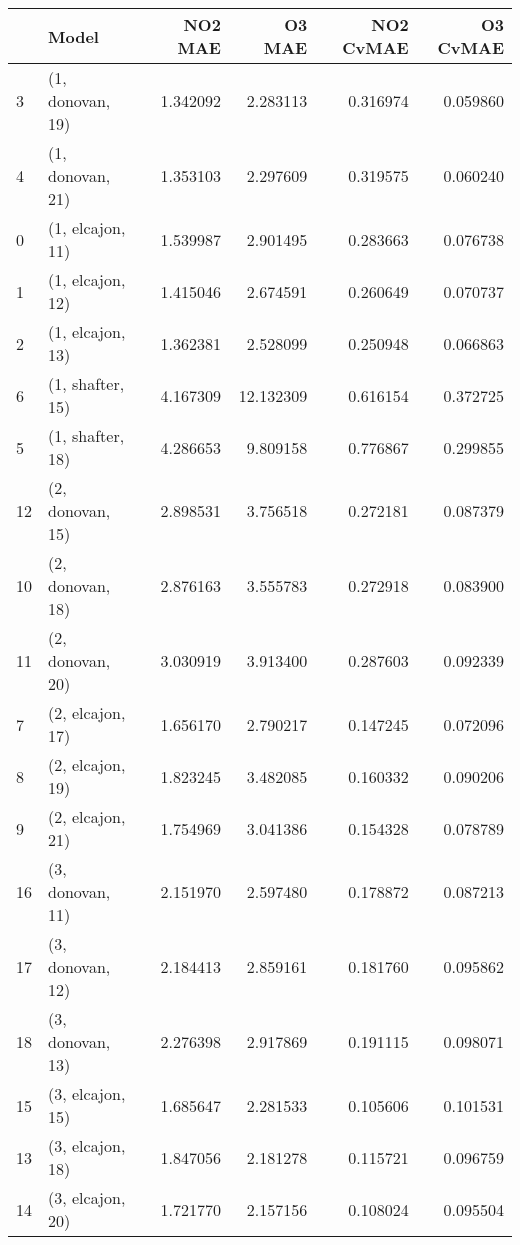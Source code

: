 \begin{tabular}{llrrrr}
\toprule
{} &             Model &   NO2 MAE &     O3 MAE &  NO2 CvMAE &  O3 CvMAE \\
\midrule
3  &  (1, donovan, 19) &  1.342092 &   2.283113 &   0.316974 &  0.059860 \\
4  &  (1, donovan, 21) &  1.353103 &   2.297609 &   0.319575 &  0.060240 \\
0  &  (1, elcajon, 11) &  1.539987 &   2.901495 &   0.283663 &  0.076738 \\
1  &  (1, elcajon, 12) &  1.415046 &   2.674591 &   0.260649 &  0.070737 \\
2  &  (1, elcajon, 13) &  1.362381 &   2.528099 &   0.250948 &  0.066863 \\
6  &  (1, shafter, 15) &  4.167309 &  12.132309 &   0.616154 &  0.372725 \\
5  &  (1, shafter, 18) &  4.286653 &   9.809158 &   0.776867 &  0.299855 \\
12 &  (2, donovan, 15) &  2.898531 &   3.756518 &   0.272181 &  0.087379 \\
10 &  (2, donovan, 18) &  2.876163 &   3.555783 &   0.272918 &  0.083900 \\
11 &  (2, donovan, 20) &  3.030919 &   3.913400 &   0.287603 &  0.092339 \\
7  &  (2, elcajon, 17) &  1.656170 &   2.790217 &   0.147245 &  0.072096 \\
8  &  (2, elcajon, 19) &  1.823245 &   3.482085 &   0.160332 &  0.090206 \\
9  &  (2, elcajon, 21) &  1.754969 &   3.041386 &   0.154328 &  0.078789 \\
16 &  (3, donovan, 11) &  2.151970 &   2.597480 &   0.178872 &  0.087213 \\
17 &  (3, donovan, 12) &  2.184413 &   2.859161 &   0.181760 &  0.095862 \\
18 &  (3, donovan, 13) &  2.276398 &   2.917869 &   0.191115 &  0.098071 \\
15 &  (3, elcajon, 15) &  1.685647 &   2.281533 &   0.105606 &  0.101531 \\
13 &  (3, elcajon, 18) &  1.847056 &   2.181278 &   0.115721 &  0.096759 \\
14 &  (3, elcajon, 20) &  1.721770 &   2.157156 &   0.108024 &  0.095504 \\
\bottomrule
\end{tabular}
